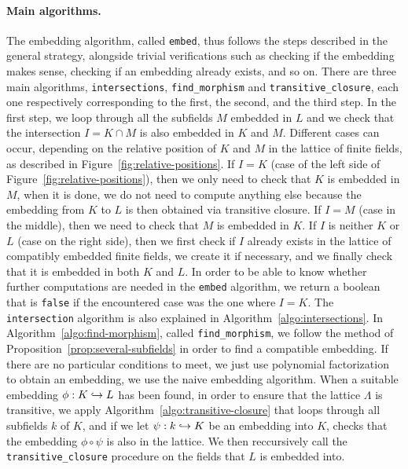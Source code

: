 \paragraph{Main algorithms.} The embedding algorithm, called \texttt{embed}, thus follows the steps
described in the general strategy, alongside trivial verifications such as
checking if the embedding makes sense, checking if an embedding already exists,
and so on. There are three main algorithms, \texttt{intersections},
\texttt{find\_morphism} and \texttt{transitive\_closure}, each one respectively
corresponding to the first, the second, and the third step. In the first step,
we loop through all the subfields $M$ embedded in $L$ and we check that the
intersection $I = K\cap M$ is also embedded in $K$ and $M$. Different cases can
occur, depending on the relative position of $K$ and $M$ in the lattice of
finite fields, as described in Figure~\ref{fig:relative-positions}. If $I=K$
(case of the left side of Figure~\ref{fig:relative-positions}), then we only
need to check that $K$ is embedded in $M$, when
it is done, we do not need to compute anything else because the embedding from
$K$ to $L$ is then obtained via transitive closure. If $I=M$ (case in the
middle), then we need to check that $M$ is embedded in $K$. If $I$ is neither
$K$ or $L$ (case on the right side), then we first check if $I$ already exists
in the lattice of compatibly embedded finite fields, we create it if necessary,
and we finally check that it is embedded in both $K$ and $L$. In order to be
able to know whether further computations are needed in the \texttt{embed}
algorithm, we return a boolean that is \texttt{false} if the encountered case
was the one where $I=K$. The \texttt{intersection} algorithm is also explained
in Algorithm~\ref{algo:intersections}. In Algorithm~\ref{algo:find-morphism},
called \texttt{find\_morphism}, we follow the method of
Proposition~\ref{prop:several-subfields} in order to find a compatible
embedding. If there are no particular conditions to meet, we just use polynomial
factorization to obtain an embedding, \ie we use the naive embedding algorithm.
When a suitable embedding $\phi:K\hookrightarrow L$ has been found, in order to ensure that
the lattice $\Lambda$ is transitive, we apply
Algorithm~\ref{algo:transitive-closure} that loops through all subfields $k$ of
$K$, and if we let $\psi:k\hookrightarrow K$ be an embedding into $K$, checks that the
embedding $\phi\circ\psi$ is
also in the lattice. We then reccursively call the \texttt{transitive\_closure}
procedure on the fields that $L$ is embedded into.
